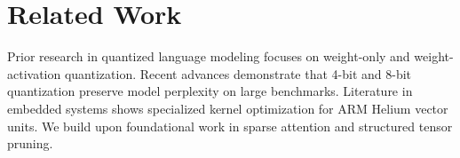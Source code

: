 \documentclass{article}
\begin{document}
\section{Related Work}
\label{sec:related_work}
Prior research in quantized language modeling focuses on weight-only and weight-activation quantization.
Recent advances demonstrate that 4-bit and 8-bit quantization preserve model perplexity on large benchmarks.
Literature in embedded systems shows specialized kernel optimization for ARM Helium vector units.
We build upon foundational work in sparse attention and structured tensor pruning.
\end{document}

